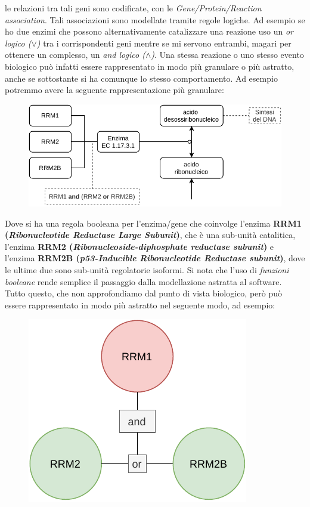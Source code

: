 \documentclass[a4paper,12pt, oneside]{book}
\begin{document}
le relazioni tra tali geni sono codificate, con le \textit{Gene/Protein/Reaction
association}. Tali associazioni sono modellate tramite regole logiche. Ad
esempio se ho due enzimi che possono alternativamente catalizzare una reazione 
uso un \textit{or logico ($\lor$)} tra i corrispondenti geni mentre se mi
servono entrambi, magari per ottenere un complesso, un \textit{and
  logico ($\land$)}.  Una
stessa reazione o uno 
stesso evento biologico può infatti essere rappresentato in modo più granulare o
più astratto, anche se sottostante si ha comunque lo stesso comportamento.
Ad esempio potremmo avere la seguente rappresentazione più granulare:
\begin{figure}[H]
  \centering
  \includegraphics[scale = 0.8]{img/ab.pdf}
\end{figure}
Dove si ha una regola booleana per l'enzima/gene che coinvolge l'enzima
\textbf{RRM1 (\textit{Ribonucleotide Reductase Large Subunit})}, che è una
sub-unità catalitica, l'enzima \textbf{RRM2 (\textit{Ribonucleoside-diphosphate
    reductase subunit})} e l'enzima \textbf{RRM2B (\textit{p53-Inducible
    Ribonucleotide Reductase subunit})}, dove le ultime due sono sub-unità
regolatorie isoformi. Si nota che l'uso di \textit{funzioni booleane} rende
semplice il passaggio dalla modellazione astratta al software.\\
Tutto questo, che non approfondiamo dal punto di vista biologico, però può
essere rappresentato in modo più astratto nel seguente modo, ad esempio:
\begin{figure}[H]
  \centering
  \includegraphics[scale = 0.8]{img/ab2.pdf}
\end{figure}
\end{document}
